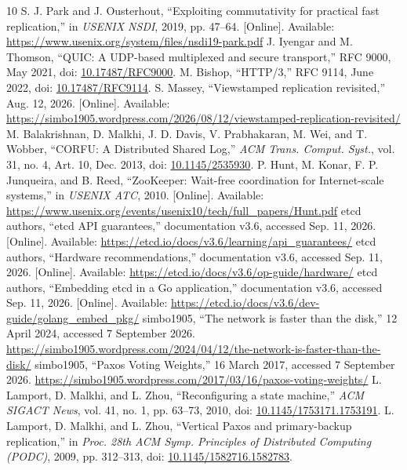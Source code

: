 \documentclass[10pt,journal,letterpaper]{IEEEtran}
\begin{document}
\begin{thebibliography}{10}
 S. J. Park and J. Ousterhout, ``Exploiting commutativity for practical fast replication,'' in \emph{USENIX NSDI}, 2019, pp. 47--64. [Online]. Available: \url{https://www.usenix.org/system/files/nsdi19-park.pdf}
 J. Iyengar and M. Thomson, ``QUIC: A UDP-based multiplexed and secure transport,'' RFC 9000, May 2021, doi: \href{https://doi.org/10.17487/RFC9000}{10.17487/RFC9000}.
 M. Bishop, ``HTTP/3,'' RFC 9114, June 2022, doi: \href{https://doi.org/10.17487/RFC9114}{10.17487/RFC9114}.
 S. Massey, ``Viewstamped replication revisited,'' Aug. 12, 2026. [Online]. Available: \url{https://simbo1905.wordpress.com/2026/08/12/viewstamped-replication-revisited/}
 M. Balakrishnan, D. Malkhi, J. D. Davis, V. Prabhakaran, M. Wei, and T. Wobber, ``CORFU: A Distributed Shared Log,'' \emph{ACM Trans. Comput. Syst.}, vol. 31, no. 4, Art. 10, Dec. 2013, doi: \href{https://doi.org/10.1145/2535930}{10.1145/2535930}.
 P. Hunt, M. Konar, F. P. Junqueira, and B. Reed, ``ZooKeeper: Wait-free coordination for Internet-scale systems,'' in \emph{USENIX ATC}, 2010. [Online]. Available: \url{https://www.usenix.org/events/usenix10/tech/full_papers/Hunt.pdf}
 etcd authors, ``etcd API guarantees,'' documentation v3.6, accessed Sep. 11, 2026. [Online]. Available: \url{https://etcd.io/docs/v3.6/learning/api_guarantees/}
 etcd authors, ``Hardware recommendations,'' documentation v3.6, accessed Sep. 11, 2026. [Online]. Available: \url{https://etcd.io/docs/v3.6/op-guide/hardware/}
 etcd authors, ``Embedding etcd in a Go application,'' documentation v3.6, accessed Sep. 11, 2026. [Online]. Available: \url{https://etcd.io/docs/v3.6/dev-guide/golang_embed_pkg/}
 simbo1905, ``The network is faster than the disk,'' 12 April
2024, accessed 7 September 2026.
\url{https://simbo1905.wordpress.com/2024/04/12/the-network-is-faster-than-the-disk/}
 simbo1905, ``Paxos Voting Weights,'' 16 March 2017,
accessed 7 September 2026.
\url{https://simbo1905.wordpress.com/2017/03/16/paxos-voting-weights/}
 L. Lamport, D. Malkhi, and L. Zhou, ``Reconfiguring a state machine,'' \emph{ACM SIGACT News}, vol. 41, no. 1, pp. 63--73, 2010, doi: \href{https://doi.org/10.1145/1753171.1753191}{10.1145/1753171.1753191}.
 L. Lamport, D. Malkhi, and L. Zhou, ``Vertical Paxos and primary-backup replication,'' in \emph{Proc. 28th ACM Symp. Principles of Distributed Computing (PODC)}, 2009, pp. 312--313, doi: \href{https://doi.org/10.1145/1582716.1582783}{10.1145/1582716.1582783}.

\end{thebibliography}
\end{document}
